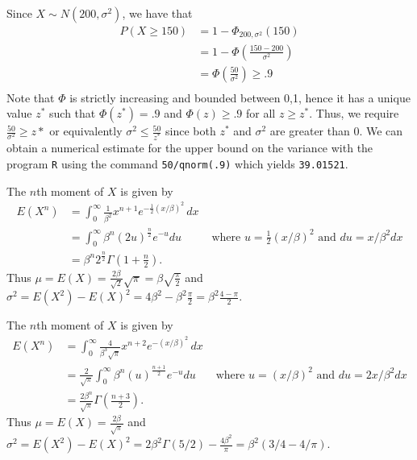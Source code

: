 \documentclass{stat_homework}
\begin{document}
\begin{solution}
  Since $X\sim N(200,\sigma^2)$, we have that 
  \begin{align*}
    P(X\ge 150) &= 1 - \Phi_{200,\sigma^2}(150) \\
    &= 1-\Phi\left(\frac{150-200}{\sigma^2}\right) \\
    &= \Phi\left(\frac{50}{\sigma^2}\right) \ge .9 \\
  \end{align*}
  Note that $\Phi$ is strictly increasing and bounded between 0,1, hence it has a unique value $z^*$ such that $\Phi(z^*) = .9$ and $\Phi(z) \ge .9$ for all $z \ge z^*$.  Thus, we require $\frac{50}{\sigma^2} \ge z*$ or equivalently $\sigma^2\le \frac{50}{z^*}$ since both $z^*$ and $\sigma^2$ are greater than 0.  We can obtain a numerical estimate for the upper bound on the variance with the program \texttt{R} using the command \texttt{50/qnorm(.9)} which yields \texttt{39.01521}.
\end{solution}


\begin{solution}
The $n$th moment of $X$ is given by
\begin{align*}
E(X^n) &= \int_0^\infty \frac{1}{\beta^2} x^{n+1} e^{-\frac12 (x/\beta)^2}\,dx\\
  &= \int_0^\infty \beta^n (2u)^{\frac n2} e^{-u}du &\text{ where }u = \frac12 (x/\beta)^2\text{ and }du = x/\beta^2 dx \\
  &= \beta^{n}2^{\frac n2} \Gamma\left(1+\frac n2\right).
\end{align*}
Thus $\mu = E(X) = \frac {2\beta}{ \sqrt 2} \sqrt{\pi} = \beta\sqrt{\frac{\pi}{2}}$ and $\sigma^2 = E(X^2) - E(X)^2 = 4 \beta^2 - \beta^2 \frac{\pi}{2} = \beta^2\frac{4-\pi}{2}$.
\end{solution}
\newpage


\begin{solution}
The $n$th moment of $X$ is given by
\begin{align*}
E(X^n) &= \int_0^\infty \frac{4}{\beta^3 \sqrt\pi} x^{n+2} e^{-(x/\beta)^2}\,dx\\
  &= \frac 2{\sqrt\pi}\int_0^\infty \beta^n (u)^{\frac{n+1}{2}} e^{-u}du &\text{ where }u = (x/\beta)^2\text{ and }du = 2x/\beta^2 dx \\
  &= \frac {2 \beta^n}{\sqrt\pi}\Gamma\left(\frac {n+3}2\right).
\end{align*}
Thus $\mu = E(X) =\frac{ 2 \beta}{\sqrt\pi}$ and $\sigma^2 = E(X^2) - E(X)^2 = 2 \beta^2\Gamma(5/2) - \frac{4 \beta^2}{\pi} = \beta^2(3/4 - 4/\pi)$.
\end{solution}
\end{document}
